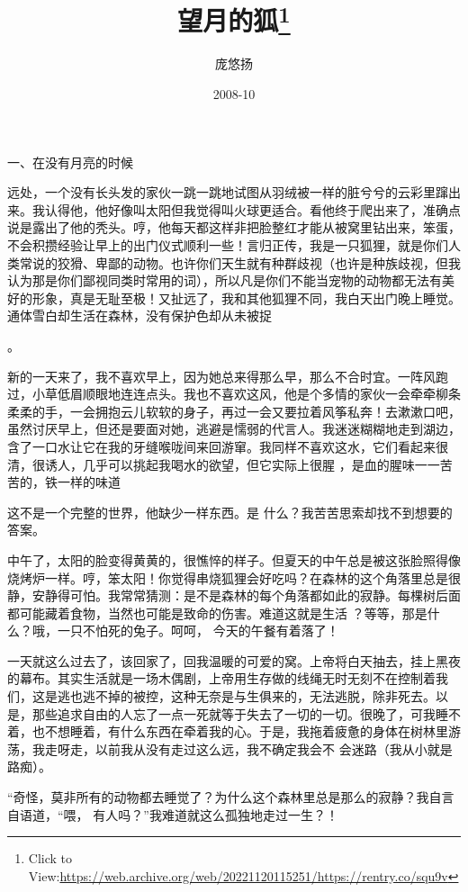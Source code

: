 \documentclass{article}
\title{望月的狐\footnote{Click to View:\url{https://web.archive.org/web/20221120115251/https://rentry.co/squ9v}}}
\author{庞悠扬}
\date{2008-10}
\begin{document}

\maketitle


\Large


﻿一、在没有月亮的时候 

远处，一个没有长头发的家伙一跳一跳地试图从羽绒被一样的脏兮兮的云彩里蹿出来。我认得他，他好像叫太阳但我觉得叫火球更适合。看他终于爬出来了，准确点说是露出了他的秃头。哼，他每天都这样非把脸整红才能从被窝里钻出来，笨蛋，不会积攒经验让早上的出门仪式顺利一些！言归正传，我是一只狐狸，就是你们人类常说的狡猾、卑鄙的动物。也许你们天生就有种群歧视（也许是种族歧视，但我认为那是你们鄙视同类时常用的词），所以凡是你们不能当宠物的动物都无法有美好的形象，真是无耻至极！又扯远了，我和其他狐狸不同，我白天出门晚上睡觉。通体雪白却生活在森林，没有保护色却从未被捉

\newpage
。 

新的一天来了，我不喜欢早上，因为她总来得那么早，那么不合时宜。一阵风跑过，小草低眉顺眼地连连点头。我也不喜欢这风，他是个多情的家伙一会牵牵柳条柔柔的手，一会拥抱云儿软软的身子，再过一会又要拉着风筝私奔！去漱漱口吧，虽然讨厌早上，但还是要面对她，逃避是懦弱的代言人。我迷迷糊糊地走到湖边，含了一口水让它在我的牙缝喉咙间来回游窜。我同样不喜欢这水，它们看起来很清，很诱人，几乎可以挑起我喝水的欲望，但它实际上很腥
，是血的腥味一一苦苦的，铁一样的味道 

这不是一个完整的世界，他缺少一样东西。是
什么？我苦苦思索却找不到想要的答案。 

中午了，太阳的脸变得黄黄的，很憔悴的样子。但夏天的中午总是被这张脸照得像烧烤炉一样。哼，笨太阳！你觉得串烧狐狸会好吃吗？在森林的这个角落里总是很静，安静得可怕。我常常猜测：是不是森林的每个角落都如此的寂静。每棵树后面都可能藏着食物，当然也可能是致命的伤害。难道这就是生活
\newpage
？等等，那是什么？哦，一只不怕死的兔子。呵呵，
今天的午餐有着落了！ 

一天就这么过去了，该回家了，回我温暖的可爱的窝。上帝将白天抽去，挂上黑夜的幕布。其实生活就是一场木偶剧，上帝用生存做的线绳无时无刻不在控制着我们，这是逃也逃不掉的被控，这种无奈是与生俱来的，无法逃脱，除非死去。以是，那些追求自由的人忘了一点一死就等于失去了一切的一切。很晚了，可我睡不着，也不想睡着，有什么东西在牵着我的心。于是，我拖着疲惫的身体在树林里游荡，我走呀走，以前我从没有走过这么远，我不确定我会不
会迷路（我从小就是路痴）。 

“奇怪，莫非所有的动物都去睡觉了？为什么这个森林里总是那么的寂静？我自言自语道，“喂，
有人吗？”我难道就这么孤独地走过一生？！ 
\end{document}
